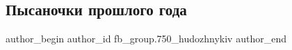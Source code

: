  
 
 
 
 
 
\subsection{Пысаночки прошлого года}
\label{sec:17_04_2017.fb.fb_group.750_hudozhnykiv.1.pysanochky_proshlogo_goda}
 
\ifcmt
 author_begin
   author_id fb_group.750_hudozhnykiv
 author_end
\fi
